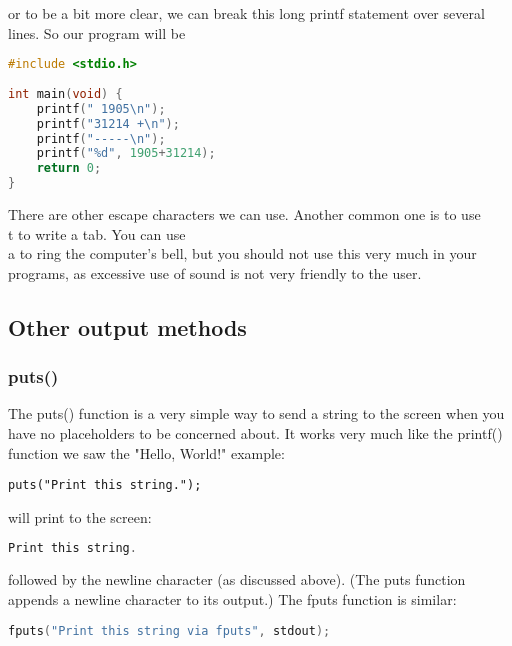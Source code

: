 or to be a bit more clear, we can break this long printf statement over several
lines. So our program will be
\lstset{basicstyle=\scriptsize, numbers=left, captionpos=b, tabsize=4}
\begin{lstlisting}[caption=Section \thesection listing \arabic{inout},language={C},
breaklines=true,xleftmargin=15pt,label=lst:section\thesection listing\arabic{inout}]
#include <stdio.h>
 
int main(void) {
	printf(" 1905\n");
	printf("31214 +\n");
	printf("-----\n");
	printf("%d", 1905+31214);
	return 0;
}
\end{lstlisting}
There are other escape characters we can use. Another common one is to use \\t
to write a tab. You can use \\a to ring the computer's bell, but you should not
use this very much in your programs, as excessive use of sound is not very
friendly to the user.

\subsection{Other output methods}
\subsubsection{puts()}
The puts() function is a very simple way to send a string to the screen when
you have no placeholders to be concerned about. It works very much like the
printf() function we saw the "Hello, World!" example:
\scriptsize
\begin{verbatim}
puts("Print this string.");
\end{verbatim}
\normalsize

will print to the screen:
\lstset{basicstyle=\scriptsize, numbers=left, captionpos=b, tabsize=4}
\begin{lstlisting}[caption=Section \thesection listing \arabic{inout},language={C},
breaklines=true,xleftmargin=15pt,label=lst:section\thesection listing\arabic{inout}]
Print this string.
\end{lstlisting}

followed by the newline character (as discussed above). (The puts function
appends a newline character to its output.) The fputs function is similar:
\lstset{basicstyle=\scriptsize, numbers=left, captionpos=b, tabsize=4}
\begin{lstlisting}[caption=Section \thesection listing \arabic{inout},language={C},
breaklines=true,xleftmargin=15pt,label=lst:section\thesection listing\arabic{inout}]
fputs("Print this string via fputs", stdout);
\end{lstlisting}

